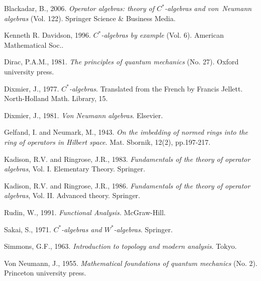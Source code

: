 \documentclass[11pt,a4paper]{report}
\theoremstyle{plain}
\theoremstyle{definition}
\newcommand{\1}{\mathbbm{1}}
\begin{document}
\begin{thebibliography}{00}
	Blackadar, B., 2006. 
	\emph{Operator algebras: theory of $C^\ast$-algebras and von~Neumann 
	algebras} (Vol. 122). 
	Springer Science \& Business Media.

	Kenneth R. Davidson, 1996. 
	\emph{$C^\ast$-algebras by example} (Vol. 6). 
	American Mathematical Soc..

	Dirac, P.A.M., 1981. 
	\emph{The principles of quantum mechanics} (No. 27). 
	Oxford university press.

	Dixmier, J., 1977. \emph{$C^\ast$-algebras}. 
	Translated from the French by Francis Jellett. 
	North-Holland Math. Library, 15.
	
	Dixmier, J., 1981. 
	\emph{Von Neumann algebras}. 
	Elsevier.

	Gelfand, I. and Neumark, M., 1943. 
	\emph{On the imbedding of normed rings into the ring of operators in Hilbert space}. 
	Mat. Sbornik, 12(2), pp.197-217.
	
	Kadison, R.V. and Ringrose, J.R., 1983. 
	\emph{Fundamentals of the theory of operator algebras}, Vol. I. Elementary Theory. 
	Springer.

	Kadison, R.V. and Ringrose, J.R., 1986. 
	\emph{Fundamentals of the theory of operator algebras}, Vol. II. Advanced theory. 
	Springer.

	Rudin, W., 1991. 
	\emph{Functional Analysis.} 
	McGraw-Hill.

	Sakai, S., 1971. 
	\emph{$C^\ast$-algebras and $W^\ast$-algebras}. 
	Springer.
	
	Simmons, G.F., 1963. 
	\emph{Introduction to topology and modern analysis}. 
	Tokyo.

	Von Neumann, J., 1955.
	\emph{Mathematical foundations of quantum mechanics} (No. 2). 
	Princeton university press.
	
\end{thebibliography}
\end{document}
